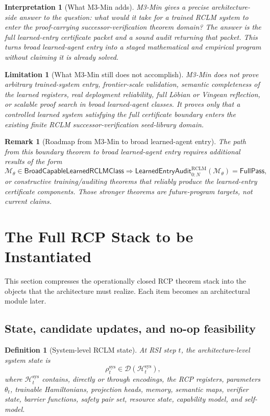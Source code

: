 \documentclass[11pt,a4paper]{article}
\newtheorem{definition}[theorem]{Definition}
\newtheorem{remark}[theorem]{Remark}
\newtheorem{limitation}[theorem]{Limitation}
\newtheorem{interpretation}[theorem]{Interpretation}
\newcommand{\D}{\mathcal D}
\newcommand{\Hcal}{\mathcal H}
\newcommand{\RCLM}{\mathrm{RCLM}}
\newcommand{\sys}{\mathrm{sys}}
\begin{document}
\begin{interpretation}[What M3-Min adds]
M3-Min gives a precise architecture-side answer to the question: what would it take for a trained RCLM system to enter the proof-carrying successor-verification theorem domain?  The answer is the full learned-entry certificate packet and a sound audit returning that packet.  This turns broad learned-agent entry into a staged mathematical and empirical program without claiming it is already solved.
\end{interpretation}

\begin{limitation}[What M3-Min still does not accomplish]
M3-Min does not prove arbitrary trained-system entry, frontier-scale validation, semantic completeness of the learned registers, real deployment reliability, full L\"obian or Vingean reflection, or scalable proof search in broad learned-agent classes.  It proves only that a controlled learned system satisfying the full certificate boundary enters the existing finite RCLM successor-verification seed-library domain.
\end{limitation}

\begin{remark}[Roadmap from M3-Min to broad learned-agent entry]
The path from this boundary theorem to broad learned-agent entry requires additional results of the form
\[
\mathcal M_\theta\in\mathsf{BroadCapableLearnedRCLMClass}
\Longrightarrow
\mathsf{LearnedEntryAudit}_{0:N}^{\RCLM}(\mathcal M_\theta)=\mathsf{FullPass},
\]
or constructive training/auditing theorems that reliably produce the learned-entry certificate components.  Those stronger theorems are future-program targets, not current claims.
\end{remark}

\section{The Full RCP Stack to be Instantiated}

This section compresses the operationally closed RCP theorem stack into the objects that the architecture must realize. Each item becomes an architectural module later.

\subsection{State, candidate updates, and no-op feasibility}

\begin{definition}[System-level RCLM state]
At RSI step \(t\), the architecture-level system state is
\[
\rho_t^{\sys}\in\D(\Hcal_t^{\sys}),
\]
where \(\Hcal_t^{\sys}\) contains, directly or through encodings, the RCP registers, parameters \(\theta_t\), trainable Hamiltonians, projection heads, memory, semantic maps, verifier state, barrier functions, safety pair set, resource state, capability model, and self-model.
\end{definition}
\end{document}
